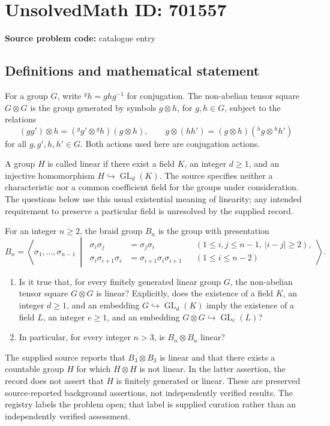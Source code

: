 \documentclass[11pt]{article}
\begin{document}
\section*{UnsolvedMath ID: 701557}
\textbf{Source problem code:} catalogue entry
\subsection{Definitions and mathematical statement}
For a group \(G\), write \({}^{g}h=ghg^{-1}\) for conjugation. The non-abelian tensor square \(G\otimes G\) is the group generated by symbols \(g\otimes h\), for \(g,h\in G\), subject to the relations
\[
(gg')\otimes h=({}^{g}g'\otimes{}^{g}h)(g\otimes h),
\qquad
g\otimes(hh')=(g\otimes h)({}^{h}g\otimes{}^{h}h')
\]
for all \(g,g',h,h'\in G\). Both actions used here are conjugation actions.

A group \(H\) is called linear if there exist a field \(K\), an integer \(d\geq1\), and an injective homomorphism \(H\hookrightarrow\operatorname{GL}_{d}(K)\). The source specifies neither a characteristic nor a common coefficient field for the groups under consideration. The questions below use this usual existential meaning of linearity; any intended requirement to preserve a particular field is unresolved by the supplied record.

For an integer \(n\geq2\), the braid group \(B_n\) is the group with presentation
\[
B_n=\left\langle \sigma_1,\ldots,\sigma_{n-1}\ \middle|\ 
\begin{aligned}
\sigma_i\sigma_j&=\sigma_j\sigma_i &&(1\leq i,j\leq n-1,\ |i-j|\geq2),\\
\sigma_i\sigma_{i+1}\sigma_i&=\sigma_{i+1}\sigma_i\sigma_{i+1} &&(1\leq i\leq n-2)
\end{aligned}
\right\rangle.
\]

\begin{enumerate}
\item[(a)] Is it true that, for every finitely generated linear group \(G\), the non-abelian tensor square \(G\otimes G\) is linear? Explicitly, does the existence of a field \(K\), an integer \(d\geq1\), and an embedding \(G\hookrightarrow\operatorname{GL}_{d}(K)\) imply the existence of a field \(L\), an integer \(e\geq1\), and an embedding \(G\otimes G\hookrightarrow\operatorname{GL}_{e}(L)\)?
\item[(b)] In particular, for every integer \(n>3\), is \(B_n\otimes B_n\) linear?
\end{enumerate}

The supplied source reports that \(B_3\otimes B_3\) is linear and that there exists a countable group \(H\) for which \(H\otimes H\) is not linear. In the latter assertion, the record does not assert that \(H\) is finitely generated or linear. These are preserved source-reported background assertions, not independently verified results. The registry labels the problem open; that label is supplied curation rather than an independently verified assessment.
\end{document}
